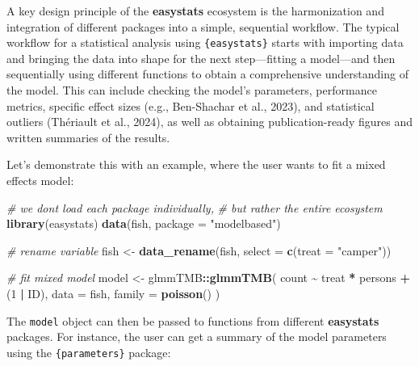 \documentclass{article}
\newenvironment{Shaded}{\begin{snugshade}}{\end{snugshade}}
\newcommand{\AttributeTok}[1]{\textcolor[rgb]{0.13,0.29,0.53}{#1}}
\newcommand{\CommentTok}[1]{\textcolor[rgb]{0.56,0.35,0.01}{\textit{#1}}}
\newcommand{\DecValTok}[1]{\textcolor[rgb]{0.00,0.00,0.81}{#1}}
\newcommand{\FunctionTok}[1]{\textcolor[rgb]{0.13,0.29,0.53}{\textbf{#1}}}
\newcommand{\NormalTok}[1]{#1}
\newcommand{\OtherTok}[1]{\textcolor[rgb]{0.56,0.35,0.01}{#1}}
\newcommand{\SpecialCharTok}[1]{\textcolor[rgb]{0.81,0.36,0.00}{\textbf{#1}}}
\newcommand{\StringTok}[1]{\textcolor[rgb]{0.31,0.60,0.02}{#1}}
\begin{document}
A key design principle of the \textbf{easystats} ecosystem is the
harmonization and integration of different packages into a simple,
sequential workflow. The typical workflow for a statistical analysis
using \texttt{\{easystats\}} starts with importing data and bringing the
data into shape for the next step---fitting a model---and then
sequentially using different functions to obtain a comprehensive
understanding of the model. This can include checking the model's
parameters, performance metrics, specific effect sizes (e.g.,
Ben-Shachar et al., 2023), and statistical outliers (Thériault et al.,
2024), as well as obtaining publication-ready figures and written
summaries of the results.

\pagebreak

Let's demonstrate this with an example, where the user wants to fit a
mixed effects model:

\begin{Shaded}
\begin{Highlighting}[]
\CommentTok{\# we don\textquotesingle{}t load each package individually,}
\CommentTok{\# but rather the entire ecosystem}
\FunctionTok{library}\NormalTok{(easystats)}
\FunctionTok{data}\NormalTok{(fish, }\AttributeTok{package =} \StringTok{"modelbased"}\NormalTok{)}

\CommentTok{\# rename variable}
\NormalTok{fish }\OtherTok{\textless{}{-}} \FunctionTok{data\_rename}\NormalTok{(fish, }\AttributeTok{select =} \FunctionTok{c}\NormalTok{(}\AttributeTok{treat =} \StringTok{"camper"}\NormalTok{))}

\CommentTok{\# fit mixed model}
\NormalTok{model }\OtherTok{\textless{}{-}}\NormalTok{ glmmTMB}\SpecialCharTok{::}\FunctionTok{glmmTMB}\NormalTok{(}
\NormalTok{  count }\SpecialCharTok{\textasciitilde{}}\NormalTok{ treat }\SpecialCharTok{*}\NormalTok{ persons }\SpecialCharTok{+}\NormalTok{ (}\DecValTok{1} \SpecialCharTok{|}\NormalTok{ ID),}
  \AttributeTok{data =}\NormalTok{ fish,}
  \AttributeTok{family =} \FunctionTok{poisson}\NormalTok{()}
\NormalTok{)}
\end{Highlighting}
\end{Shaded}

The \texttt{model} object can then be passed to functions from different
\textbf{easystats} packages. For instance, the user can get a summary of
the model parameters using the \texttt{\{parameters\}} package:
\end{document}
